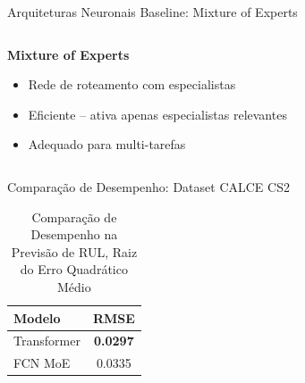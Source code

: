 \documentclass[aspectratio=169,xcolor=dvipsnames]{beamer}
\begin{document}
\begin{frame}{Arquiteturas Neuronais Baseline: Mixture of Experts}
  \begin{columns}[T]
    \begin{column}{0.5\textwidth}
      \textbf{Mixture of Experts}
      \begin{itemize}
        \item Rede de roteamento com especialistas
        \item Eficiente -- ativa apenas especialistas relevantes
        \item Adequado para multi-tarefas
      \end{itemize}
    \end{column}
    \begin{column}{0.5\textwidth}
      \centering
    \end{column}
  \end{columns}
\end{frame}

\begin{frame}{Comparação de Desempenho: Dataset CALCE CS2}
  \begin{table}
    \centering
    \caption{Comparação de Desempenho na Previsão de RUL, Raiz do Erro Quadrático Médio}
    \begin{tabular}{lc}
      \toprule
      \textbf{Modelo} & \textbf{RMSE} \\
      \midrule
      Transformer & \textbf{0.0297} \\ 
      FCN MoE & 0.0335 \\
      \bottomrule
    \end{tabular}
  \end{table}
\end{frame}
\end{document}
